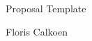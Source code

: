 \thispagestyle{plain}
\begin{center}
    \huge
    Proposal Template
    \vspace{0.5cm}
    \LARGE

    \vspace{0.5cm}

    \large
    Floris Calkoen

    \vspace{0.5cm}

    \vspace{0.5cm}

    \date{\today}

    \vspace{1.5cm}

\end{center}
